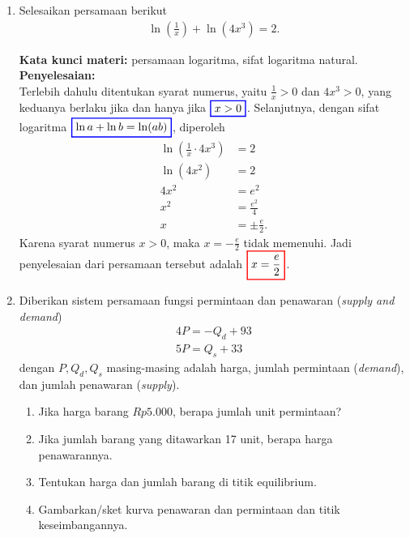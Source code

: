 \documentclass[10pt,openany,a4paper]{article}
\theoremstyle{definition}
\theoremstyle{definition}
\theoremstyle{plain}
\newenvironment{jawab}[2][tes]{%
\par\noindent\textbf{Kata kunci materi:} #1.\\
\textbf{Penyelesaian:} #2%
}{}
\begin{document}
\begin{enumerate}
\begin{jawab}[gradien garis, garis tegak lurus]
{    }
    \end{jawab}
    \item Selesaikan persamaan berikut
    \begin{align*}
        \ln \left(\frac{1}{x}\right)+\ln(4x^3)=2.
    \end{align*}
    \begin{jawab}[persamaan logaritma, sifat logaritma natural]{~\\
        Terlebih dahulu ditentukan syarat numerus, yaitu $\frac{1}{x}>0$ dan $4x^3>0$, yang keduanya berlaku jika dan hanya jika $\colorlet{oldcolor}{.}
        \color{blue}
        \setlength{\fboxrule}{1pt} \boxed{\color{oldcolor}x>0}\color{oldcolor}$. Selanjutnya, dengan sifat logaritma $\colorlet{oldcolor}{.}
        \color{blue}
        \setlength{\fboxrule}{1pt} \boxed{\color{oldcolor}\ln a + \ln b = \ln(ab)}\color{oldcolor}$, diperoleh
        \begin{align*}
            \ln \left(\frac{1}{x}\cdot 4x^3\right) &= 2\\
            \ln(4x^2) &= 2\\
            4x^2 &= e^2\\
            x^2 &= \frac{e^2}{4}\\
            x &= \pm\frac{e}{2}.
        \end{align*}
        Karena syarat numerus $x>0$, maka $x=-\frac{e}{2}$ tidak memenuhi. Jadi penyelesaian dari persamaan tersebut adalah $\colorlet{oldcolor}{.}
        \color{red}
        \setlength{\fboxrule}{1pt} \boxed{\color{oldcolor}x=\frac{e}{2}}\color{oldcolor}$.
    }
    \end{jawab}
    \item Diberikan sistem persamaan fungsi permintaan dan penawaran (\textit{supply and demand})
    \begin{align*}
       4P=-Q_d+93\\
       5P=Q_s+33
    \end{align*}
    dengan $P,Q_d,Q_s$ masing-masing adalah harga, jumlah permintaan (\textit{demand}), dan jumlah penawaran (\textit{supply}).
    \begin{enumerate}
        \item Jika harga barang $Rp5.000$, berapa jumlah unit permintaan?
        \item Jika jumlah barang yang ditawarkan 17 unit, berapa harga penawarannya.
        \item Tentukan harga dan jumlah barang di titik equilibrium.
        \item Gambarkan/sket kurva penawaran dan permintaan dan titik keseimbangannya.

\end{enumerate}
\end{enumerate}
\end{document}
